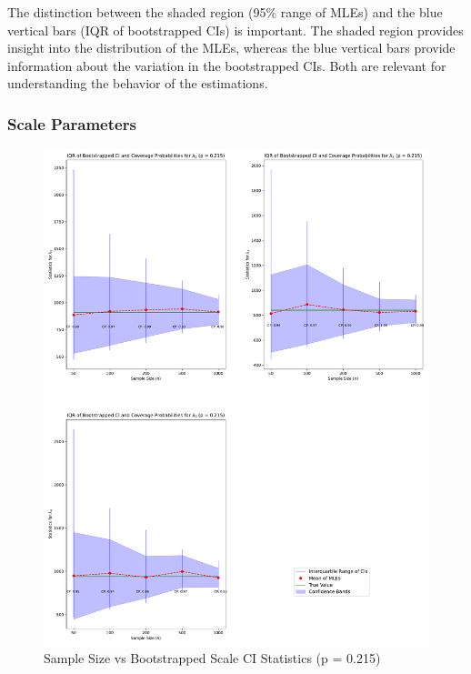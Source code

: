 \documentclass[
]{article}
\begin{document}
The distinction between the shaded region (95\% range of MLEs) and the
blue vertical bars (IQR of bootstrapped CIs) is important. The shaded
region provides insight into the distribution of the MLEs, whereas the
blue vertical bars provide information about the variation in the
bootstrapped CIs. Both are relevant for understanding the behavior of
the estimations.

\hypertarget{scale-parameters}{%
\subsubsection*{Scale Parameters}\label{scale-parameters}}

\begin{figure}

{\centering \includegraphics{image/plot-n-vs-stats-p215-scale} 

}

\caption{Sample Size vs Bootstrapped Scale CI Statistics (p = 0.215)}\label{fig:samp-size-n-vs-stats-p215-scale}
\end{figure}
\end{document}
